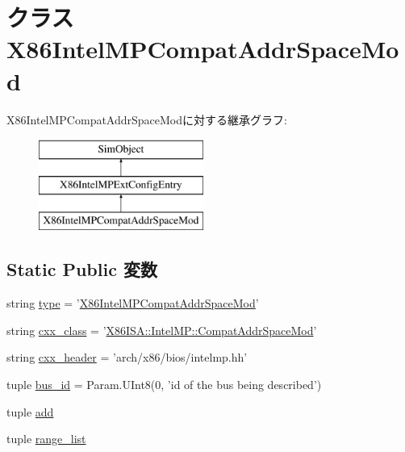 \hypertarget{classIntelMP_1_1X86IntelMPCompatAddrSpaceMod}{
\section{クラス X86IntelMPCompatAddrSpaceMod}
\label{classIntelMP_1_1X86IntelMPCompatAddrSpaceMod}
}
X86IntelMPCompatAddrSpaceModに対する継承グラフ:\begin{figure}[H]
\begin{center}
\leavevmode
\includegraphics[height=3cm]{classIntelMP_1_1X86IntelMPCompatAddrSpaceMod}
\end{center}
\end{figure}
\subsection*{Static Public 変数}
\begin{DoxyCompactItemize}
\item 
string \hyperlink{classIntelMP_1_1X86IntelMPCompatAddrSpaceMod_acce15679d830831b0bbe8ebc2a60b2ca}{type} = '\hyperlink{classIntelMP_1_1X86IntelMPCompatAddrSpaceMod}{X86IntelMPCompatAddrSpaceMod}'
\item 
string \hyperlink{classIntelMP_1_1X86IntelMPCompatAddrSpaceMod_a58cd55cd4023648e138237cfc0822ae3}{cxx\_\-class} = '\hyperlink{classX86ISA_1_1IntelMP_1_1CompatAddrSpaceMod}{X86ISA::IntelMP::CompatAddrSpaceMod}'
\item 
string \hyperlink{classIntelMP_1_1X86IntelMPCompatAddrSpaceMod_a17da7064bc5c518791f0c891eff05fda}{cxx\_\-header} = 'arch/x86/bios/intelmp.hh'
\item 
tuple \hyperlink{classIntelMP_1_1X86IntelMPCompatAddrSpaceMod_a6e34d01145c4deea78b58e36f0a7e81b}{bus\_\-id} = Param.UInt8(0, 'id of the bus being described')
\item 
tuple \hyperlink{classIntelMP_1_1X86IntelMPCompatAddrSpaceMod_ab1f40d21a14f4da963c0cfd61f6643b8}{add}
\item 
tuple \hyperlink{classIntelMP_1_1X86IntelMPCompatAddrSpaceMod_a813ba1f333443d7edeef6adeefe0dbd4}{range\_\-list}
\end{DoxyCompactItemize}


